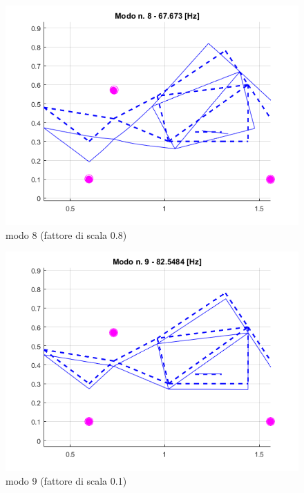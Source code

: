 \documentclass[12pt, a4paper]{article}
\begin{document}
	\begin{figure}[h]
		\centering
		\includegraphics[scale=0.6]{modo_8}
		\caption{modo 8 (fattore di scala 0.8)}
	\end{figure}
	\begin{figure}[h]
		\centering
		\includegraphics[scale=0.6]{modo_9}
		\caption{modo 9 (fattore di scala 0.1)}
	\end{figure}
	
	
	\clearpage
\end{document}
